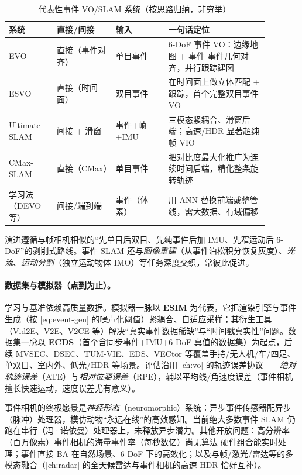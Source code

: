 \begin{table}[H]\centering\small
\caption{代表性事件 VO/SLAM 系统（按思路归纳，非穷举）}
\label{tab:event-systems}
\begin{tabular}{p{0.16\linewidth}p{0.20\linewidth}p{0.18\linewidth}p{0.34\linewidth}}
\toprule
系统 & 直接/间接 & 输入 & 一句话定位 \\
\midrule
EVO\cite{rebecq2017evo} & 直接（事件对齐）& 单目事件 & 6-DoF 事件 VO：边缘地图 + 事件-事件几何对齐，并行跟踪建图 \\
ESVO\cite{zhou2021esvo} & 直接（时间面）& 双目事件 & 在时间面上做立体匹配 + 跟踪，首个完整双目事件 VO \\
Ultimate-SLAM\cite{vidal2018ultimate} & 间接 + 滑窗 & 事件+帧+IMU & 三模态紧耦合、滑窗后端；高速/HDR 显著超纯帧 VIO \\
CMax-SLAM\cite{guo2024cmaxslam} & 直接（CMax）& 单目事件 & 把对比度最大化推广为连续时间后端，精化整条旋转轨迹 \\
学习法（DEVO 等）\cite{gallego2022eventsurvey} & 间接/端到端 & 事件（体素）& 用 ANN 替换前端或整管线，需大数据、有域偏移 \\
\bottomrule
\end{tabular}
\end{table}

\noindent 演进遵循与帧相机相似的“先单目后双目、先纯事件后加 IMU、先窄运动后 6-DoF”的剥削式路线\cite{gallego2022eventsurvey}。事件 SLAM 还与\emph{图像重建}（从事件泊松积分恢复灰度）、\emph{光流}、\emph{运动分割}（独立运动物体 IMO）等任务深度交织，常彼此促进。

\paragraph{数据集与模拟器（点到为止）。}
学习与基准依赖高质量数据。模拟器一脉以 \textbf{ESIM}\cite{rebecq2018esim} 为代表，它把渲染引擎与事件生成（按 \cref{eq:event-gen} 的噪声化阈值）紧耦合、自适应采样；其衍生工具（Vid2E、V2E、V2CE 等）解决“真实事件数据稀缺”与“时间戳真实性”问题。数据集一脉以 \textbf{ECDS}\cite{mueggler2017ecds}（首个含同步事件+IMU+6-DoF 真值的数据集）为起点，后续 MVSEC、DSEC、TUM-VIE、EDS、VECtor 等覆盖手持/无人机/车/四足、单双目、室内外、低光/HDR 等场景\cite{gallego2022eventsurvey}。评估沿用 \cref{ch:vo} 的轨迹误差协议——\emph{绝对轨迹误差}（ATE）与\emph{相对位姿误差}（RPE），辅以平均线/角速度误差（事件相机擅长快速运动，速度误差尤有意义）。

\begin{note}[前沿与开放问题]
事件相机的终极愿景是\emph{神经形态}（neuromorphic）系统：异步事件传感器配异步（脉冲）处理器，模仿动物“永远在线”的高效感知\cite{gallego2022eventsurvey}。当前绝大多数事件 SLAM 仍跑在串行（冯·诺依曼）处理器上，未释放异步潜力。其他开放问题：高分辨率（百万像素）事件相机的海量事件率（每秒数亿）尚无算法-硬件组合能实时处理；事件直接 BA 在自然场景、6-DoF 下的高效化；以及与帧/激光/雷达等的多模态融合（\cref{ch:radar} 的全天候雷达与事件相机的高速 HDR 恰好互补）。
\end{note}

